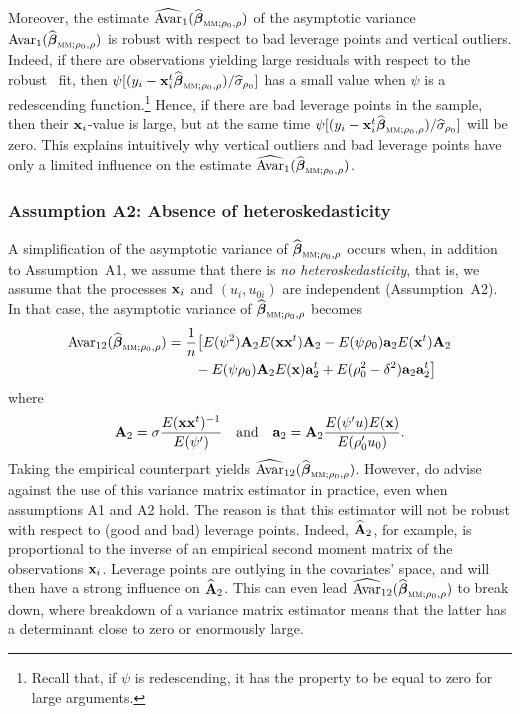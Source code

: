 Moreover, the estimate
$\sthat{\mathrm{Avar}}_1(\sthat{\boldsymbol\beta}_{\stsc{MM};\rho_0,\rho})$ of
the asymptotic variance
$\mathrm{Avar}_1(\sthat{\boldsymbol\beta}_{\stsc{MM};\rho_0,\rho})$ is robust
with respect to bad leverage points and vertical outliers. Indeed, if there are
observations yielding large residuals with respect to the robust ~fit,
then
$\psi[(y_i-\stvec{x}_i^t\sthat{\boldsymbol\beta}_{\stsc{MM};\rho_0,\rho})/\sthat{\sigma}_{\rho_0}]$
has a small value when $\psi$ is a redescending function.\footnote{Recall that,
if $\psi$ is redescending, it has the property to be equal to zero for large
arguments.} Hence, if there are bad leverage points in the sample, then their
$\mathbf x_i$-value is large, but at the same time
$\psi[(y_i-\stvec{x}_i^t\sthat{\boldsymbol\beta}_{\stsc{MM};\rho_0,\rho})/\sthat{\sigma}_{\rho_0}]$
will be zero. This explains intuitively why vertical outliers and bad leverage
points have only a limited influence on the estimate
$\sthat{\mathrm{Avar}}_1(\sthat{\boldsymbol\beta}_{\stsc{MM};\rho_0,\rho})$.

\subsubsection{Assumption A2: Absence of heteroskedasticity}

A simplification of the asymptotic variance of
$\sthat{\boldsymbol\beta}_{\stsc{MM};\rho_0,\rho}$ occurs when, in addition to
Assumption~A1, we assume that there is \emph{no heteroskedasticity}, that is,
we assume that the processes $\mathbf x_i$ and $(u_i,u_{0i})$ are independent
(Assumption~A2). In that case, the asymptotic variance of
$\sthat{\boldsymbol\beta}_{\stsc{MM};\rho_0,\rho}$ becomes
\[
\begin{split}
    \mathrm{Avar}_{12}(\sthat{\boldsymbol\beta}_{\stsc{MM};\rho_0,\rho})
    & = \frac{1}{n} \big[ E(\psi^2)\stmat{A}_2 E(\stvec{x}\stvec{x}^t) \stmat{A}_2
      - E(\psi\rho_0) \stmat{a}_2 E(\stvec{x}^t) \stmat{A}_2
    \\
    & \qquad
      - E(\psi\rho_0) \stmat{A}_2 E(\stvec{x}) \stmat{a}_2^t
      + E(\rho_0^2-\delta^2)  \stmat{a}_2\stmat{a}_2^t \big]
\end{split}
\]
where
\[
    \mathbf A_2 = \sigma \frac{E(\mathbf x\mathbf x^t)^{-1}}{E(\psi')}
    \quad\text{and}\quad
    \mathbf a_2 = \mathbf A_2 \frac{E(\psi'u) E(\mathbf x)}{E(\rho_0'u_0)}.
\]
Taking the empirical counterpart yields
$\sthat{\mathrm{Avar}}_{12}(\sthat{\boldsymbol\beta}_{\stsc{MM};\rho_0,\rho})$.
However, \citet{Croux:2003} do advise against the use of this variance matrix
estimator in practice, even when assumptions A1 and A2 hold. The reason is that
this estimator will not be robust with respect to (good and bad) leverage
points. Indeed, $\widehat{\mathbf A}_2$, for example, is proportional to the
inverse of an empirical second moment matrix of the observations $\mathbf x_i$.
Leverage points are outlying in the covariates' space, and will then have a
strong influence on $\widehat{\mathbf A}_2$. This can even lead
$\sthat{\mathrm{Avar}}_{12}(\sthat{\boldsymbol\beta}_{\stsc{MM};\rho_0,\rho})$
to break down, where breakdown of a variance matrix estimator means that the
latter has a determinant close to zero or enormously large.

